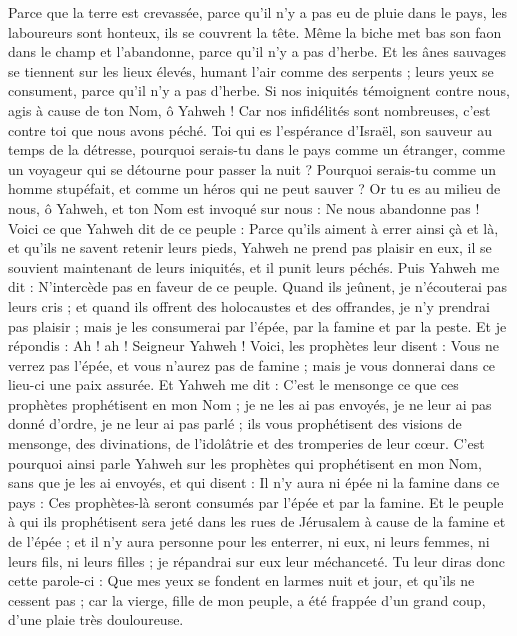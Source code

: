 \begin{multicols}{2}
Parce que la terre est crevassée, parce qu'il n'y a pas eu de pluie dans le pays, les laboureurs sont honteux, ils se couvrent la tête.
Même la biche met bas son faon dans le champ et l'abandonne, parce qu'il n'y a pas d'herbe.
Et les ânes sauvages se tiennent sur les lieux élevés, humant l'air comme des serpents ; leurs yeux se consument, parce qu'il n'y a pas d'herbe.
Si nos iniquités témoignent contre nous, agis à cause de ton Nom, ô Yahweh ! Car nos infidélités sont nombreuses, c'est contre toi que nous avons péché.
Toi qui es l'espérance d'Israël, son sauveur au temps de la détresse, pourquoi serais-tu dans le pays comme un étranger, comme un voyageur qui se détourne pour passer la nuit ?
Pourquoi serais-tu comme un homme stupéfait, et comme un héros qui ne peut sauver ? Or tu es au milieu de nous, ô Yahweh, et ton Nom est invoqué sur nous : Ne nous abandonne pas !
Voici ce que Yahweh dit de ce peuple : Parce qu'ils aiment à errer ainsi çà et là, et qu'ils ne savent retenir leurs pieds, Yahweh ne prend pas plaisir en eux, il se souvient maintenant de leurs iniquités, et il punit leurs péchés.
Puis Yahweh me dit : N'intercède pas en faveur de ce peuple.
Quand ils jeûnent, je n'écouterai pas leurs cris ; et quand ils offrent des holocaustes et des offrandes, je n'y prendrai pas plaisir ; mais je les consumerai par l'épée, par la famine et par la peste.
Et je répondis : Ah ! ah ! Seigneur Yahweh ! Voici, les prophètes leur disent : Vous ne verrez pas l'épée, et vous n'aurez pas de famine ; mais je vous donnerai dans ce lieu-ci une paix assurée.
Et Yahweh me dit : C'est le mensonge ce que ces prophètes prophétisent en mon Nom ; je ne les ai pas envoyés, je ne leur ai pas donné d'ordre, je ne leur ai pas parlé ; ils vous prophétisent des visions de mensonge, des divinations, de l'idolâtrie et des tromperies de leur cœur.
C'est pourquoi ainsi parle Yahweh sur les prophètes qui prophétisent en mon Nom, sans que je les ai envoyés, et qui disent : Il n'y aura ni épée ni la famine dans ce pays : Ces prophètes-là seront consumés par l'épée et par la famine.
Et le peuple à qui ils prophétisent sera jeté dans les rues de Jérusalem à cause de la famine et de l'épée ; et il n'y aura personne pour les enterrer, ni eux, ni leurs femmes, ni leurs fils, ni leurs filles ; je répandrai sur eux leur méchanceté.
Tu leur diras donc cette parole-ci : Que mes yeux se fondent en larmes nuit et jour, et qu'ils ne cessent pas ; car la vierge, fille de mon peuple, a été frappée d'un grand coup, d'une plaie très douloureuse.

\end{multicols}
